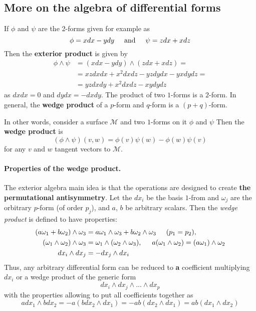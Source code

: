 
\subsection{More on the algebra of differential forms}

If $\phi$ and $\psi$ are the 2-forms given for example as 
\begin{equation}
\phi = x dx - y dy \hspace{5mm} \text{and} \hspace{5mm}\psi = z dx + x dz
\end{equation}
Then the \textbf{exterior product} is given by 
\begin{align}
\phi\wedge\psi &= (x dx - y dy)\wedge(zdx + xdz) = \\
&=xzdxdx+x^2dxdz-yzdydx-yxdydz= \\
&=yzdxdy + x^2 dx dz - xydydz
\end{align}
as $dxdx=0$ and $dydx=-dxdy$. 
The product of two $1$-forms is a $2$-form.
In general, the \textbf{wedge product} of a $p$-form and $q$-form is a $(p+q)$-form.

In other words, consider a surface $\mathcal{M}$ and two $1$-forms on it $\phi$ and $\psi$ Then the \textbf{wedge product} is 
\begin{equation}
(\phi\wedge\psi)(v,w)=\phi(v)\psi(w) - \phi(w)\psi(v)
\end{equation}
for any $v$ and $w$ tangent vectors to $\mathcal{M}$.

\paragraph{Properties of the wedge product.} The exterior algebra main idea is that the operations are designed to create \textbf{the permutational antisymmetry}. 
Let the $dx_i$ be the basis $1$-from and $\omega_j$ are the orbitrary $p$-form (of order $p_j$), and $a$, $b$ be arbitrary scalars. 
Then the \textit{wedge product} is defined to have properties:
\begin{align}
(a\omega_1+b\omega_2)\wedge\omega_3 &= a\omega_1\wedge\omega_3+b\omega_2\wedge\omega_3 \hspace{5mm} (p_1 = p_2), \\
(\omega_1\wedge\omega_2)\wedge\omega_3 &= \omega_1\wedge(\omega_2\wedge\omega_3), \hspace{5mm} a(\omega_1\wedge\omega_2) =  (a\omega_1)\wedge\omega_2\\
dx_i\wedge dx_j &= -dx_j\wedge dx_i
\end{align}
Thus, any arbitrary differential form can be reduced to \textbf{a} coefficient multiplying $dx_i$ or a wedge product of the generic form 
\begin{equation}
dx_i\wedge dx_j \wedge...\wedge dx_p
\end{equation}
with the properties allowing to put all coefficients together as 
\begin{equation}
a dx_1 \wedge b dx_2 = - a(b dx_2 \wedge dx_1) = -ab(dx_2 \wedge dx_1) = ab(dx_1 \wedge dx_2)
\end{equation}

